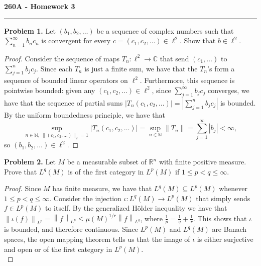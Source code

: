 \documentclass[11pt,letterpaper]{report}
\newcommand{\naturals}{\mathbb{N}}
\newcommand{\complex}{\mathbb{C}}
\newcommand{\reals}{\mathbb{R}}
\newcommand{\Lp}[2]{\left\|{#1}\right\|_{L^{#2}}}
\begin{document}
\begin{center}
{\bf \Large 260A - Homework 3} %
\vspace{0.2cm}
\hrule
\end{center}

\noindent\textbf{Problem 1. }
Let $(b_1, b_2, \ldots)$ be a sequence of complex numbers such that $\sum_{n=1}^\infty b_nc_n$ is convergent for every $c = (c_1, c_2, \ldots)\in \ell^2$. Show that $b\in \ell^2$.
\begin{proof}
	Consider the sequence of maps $T_n: \ell^2\to \complex$ that send $(c_1, \ldots)$ to $\sum_{j=1}^n b_jc_j$. Since each $T_n$ is just a finite sum, we have that the $T_n$'s form a sequence of bounded linear operators on $\ell^2$. Furthermore, this sequence is pointwise bounded: given any $(c_1, c_2, \ldots)\in \ell^2$, since $\sum_{j=1}^\infty b_jc_j$ converges, we have that the sequence of partial sums $|T_n(c_1, c_2, \ldots)| = |\sum_{j=1}^n b_jc_j|$ is bounded. By the uniform boundedness principle, we have that
	\[
	\sup_{n\in \naturals,\ \|(c_1, c_2, \ldots)\|_2 = 1}|T_n(c_1, c_2, \ldots)| = \sup_{n\in \naturals}\|T_n\| = \sum_{j=1}^\infty |b_j|<\infty,
	\]
	so $(b_1, b_2, \ldots)\in \ell^2$.
\end{proof}

\noindent\textbf{Problem 2. }
Let $M$ be a measurable subset of $\reals^n$ with finite positive measure. Prove that $L^q(M)$ is of the first category in $L^p(M)$ if $1\leq p<q\leq \infty$.
\begin{proof}
	Since $M$ has finite measure, we have that $L^q(M)\subseteq L^p(M)$ whenever $1\leq p<q\leq \infty$. Consider the injection $\iota: L^q(M)\to L^p(M)$ that simply sends $f\in L^p(M)$ to itself. By the generalized H\"older inequality we have that $\Lp{\iota(f)}{p} = \Lp{f}{p}\leq \mu(M)^{1/r}\Lp{f}{q}$, where $\frac{1}{p} = \frac{1}{q} + \frac{1}{r}$. This shows that $\iota$ is bounded, and therefore continuous. Since $L^p(M)$ and $L^q(M)$ are Banach spaces, the open mapping theorem tells us that the image of $\iota$ is either surjective and open or of the first category in $L^p(M)$.\\

	\noindent
\end{proof}
\end{document}
